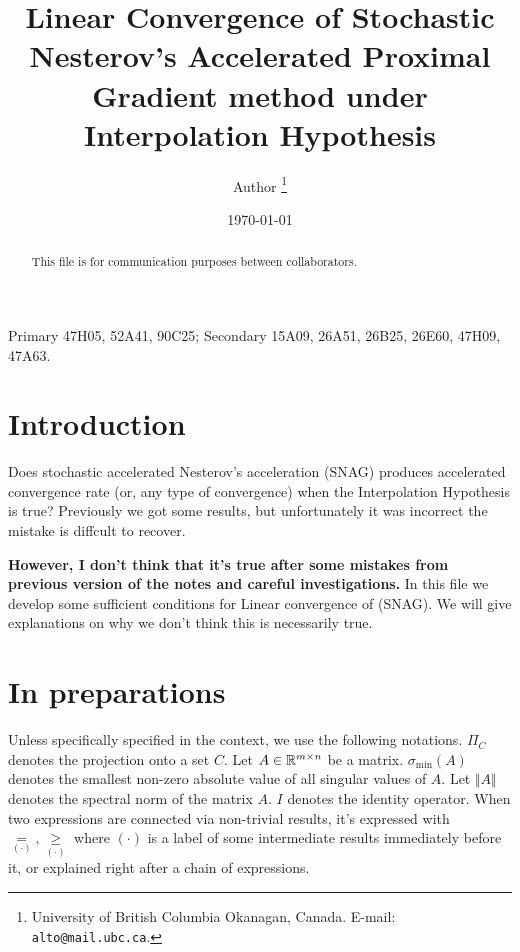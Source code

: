 \documentclass[12pt]{article}
\begin{document}
\title{{\selectfont Linear Convergence of Stochastic Nesterov's Accelerated Proximal Gradient method under Interpolation Hypothesis}}

\author{
    Author
    \thanks{
        University of British Columbia Okanagan,
        Canada. E-mail: \texttt{alto@mail.ubc.ca}.
    }
}

\date{\today}

\maketitle
{}

\begin{abstract} 
    This file is for communication purposes between collaborators. 

\end{abstract}

Primary 47H05, 52A41, 90C25; Secondary 15A09, 26A51, 26B25, 26E60, 47H09, 47A63.


\section{Introduction}
    Does stochastic accelerated Nesterov's acceleration (SNAG) produces accelerated convergence rate (or, any type of convergence) when the Interpolation Hypothesis is true? 
    \cite{bauschke_convex_2017}
    Previously we got some results, but unfortunately it was incorrect the mistake is diffcult to recover. 
    \par
    \textbf{However, I don't think that it's true after some mistakes from previous version of the notes and careful investigations.}
    In this file we develop some sufficient conditions for Linear convergence of (SNAG). 
    We will give explanations on why we don't think this is necessarily true. 

\section{In preparations}
    Unless specifically specified in the context, we use the following notations. 
    $\Pi_C$ denotes the projection onto a set $C$. 
    Let $A \in \mathbb R^{m \times n}$ be a matrix. 
    $\sigma_{\min}(A)$ denotes the smallest non-zero absolute value of all singular values of $A$. 
    Let $\Vert A\Vert$ denotes the spectral norm of the matrix $A$. 
    $I$ denotes the identity operator. 
    When two expressions are connected via non-trivial results, it's expressed with $\underset{(\cdot)}{=}, \underset{(\cdot)}{\ge}$ where $(\cdot)$ is a label of some intermediate results immediately before it, or explained right after a chain of expressions. 
\end{document}

